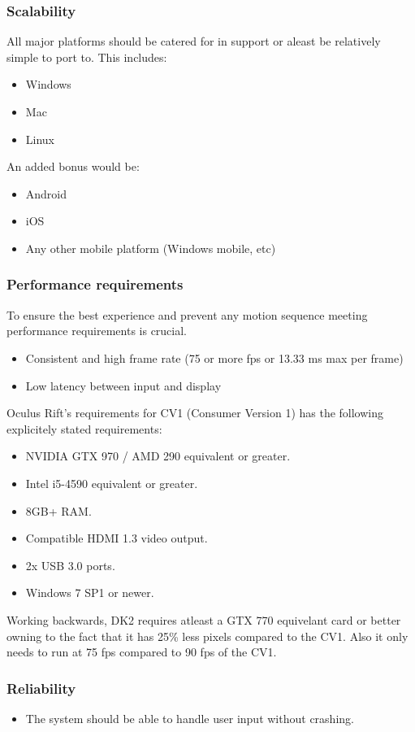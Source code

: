\documentclass[a4paper,12pt]{article}
\begin{document}
\subsubsection{Scalability}
All major platforms should be catered for in support or aleast be relatively simple to port to. This includes:
	\begin{itemize}
		\item Windows
		\item Mac
		\item Linux		
	\end{itemize}
An added bonus would be:
	\begin{itemize}
		\item Android
		\item iOS
		\item Any other mobile platform (Windows mobile, etc)
	\end{itemize}
	
\subsubsection{Performance requirements}
To ensure the best experience and prevent any motion sequence meeting performance requirements is crucial.
	\begin{itemize}
		\item Consistent and high frame rate (75 or more fps or 13.33 ms max per frame)
		\item Low latency between input and display
	\end{itemize}
Oculus Rift's requirements for CV1 (Consumer Version 1) has the following explicitely stated requirements:
\begin{itemize}
	\item NVIDIA GTX 970 / AMD 290 equivalent or greater.
	\item Intel i5-4590 equivalent or greater.
	\item 8GB+ RAM.
	\item Compatible HDMI 1.3 video output.
	\item 2x USB 3.0 ports.
	\item Windows 7 SP1 or newer.
\end{itemize}
Working backwards, DK2 requires atleast a GTX 770 equivelant card or better owning to the fact that it has 25\% less pixels compared to the CV1. Also it only needs to run at 75 fps compared to 90 fps of the CV1.
\subsubsection{Reliability}
	\begin{itemize}
		\item The system should be able to handle user input without crashing.
	\end{itemize}
\end{document}
